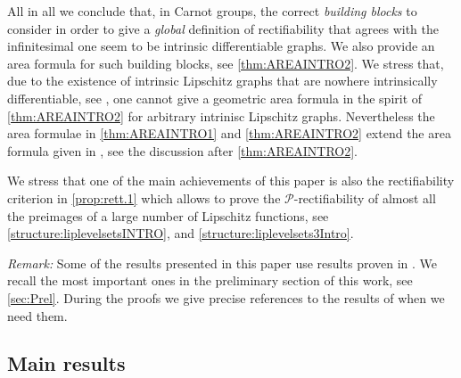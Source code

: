 \documentclass[10pt, a4paper,
oneside, headinclude,footinclude]{scrartcl}
\begin{document}
All in all we conclude that, in Carnot groups, the correct \textit{building blocks} to consider in order to give a \textit{global} definition of rectifiability that agrees with the infinitesimal one seem to be intrinsic differentiable graphs. We also provide an area formula for such building blocks, see \cref{thm:AREAINTRO2}. We stress that, due to the existence of intrinsic Lipschitz graphs that are nowhere intrinsically differentiable, see \cite{JNGV20a}, one cannot give a geometric area formula in the spirit of \cref{thm:AREAINTRO2} for arbitrary intrinisc Lipschitz graphs. Nevertheless the area formulae in \cref{thm:AREAINTRO1} and \cref{thm:AREAINTRO2} extend the area formula given in \cite[Theorem 1.1]{JNGV20}, see the discussion after \cref{thm:AREAINTRO2}.

We stress that one of the main achievements of this paper is also the rectifiability criterion in \cref{prop:rett.1} which allows to prove the $\mathscr{P}$-rectifiability of almost all the preimages of a large number of Lipschitz functions, see \cref{structure:liplevelsetsINTRO}, and \cref{structure:liplevelsets3Intro}. 

{\em Remark:} Some of the results presented in this paper use results proven in \cite[Sections 2-3-4-6]{antonelli2020rectifiable}. We recall the most important ones in the preliminary section of this work, see \cref{sec:Prel}. During the proofs we give precise references to the results of \cite{antonelli2020rectifiable} when we need them.


\subsection{Main results}
\end{document}
